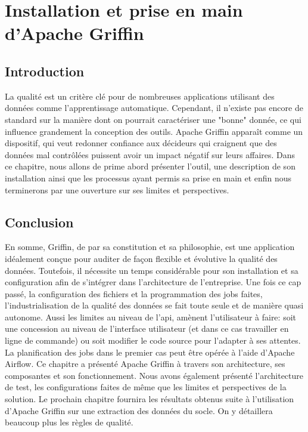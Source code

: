 \chapter{Installation et prise en main d'Apache Griffin}
\section*{Introduction}
La qualité est un critère clé pour de nombreuses applications utilisant des données comme l’apprentissage automatique. Cependant, il n’existe pas encore de standard sur la manière dont on pourrait caractériser une "bonne" donnée, ce qui influence grandement la conception des outils. Apache Griffin apparaît comme un dispositif, qui veut redonner confiance aux décideurs qui craignent que des données mal contrôlées puissent avoir un impact négatif sur leurs affaires. Dans ce chapitre, nous allons de prime abord pr\'esenter l'outil, une description de son installation ainsi que les processus ayant permis sa prise en main et enfin nous terminerons par une ouverture sur ses limites et perspectives.



\section*{Conclusion}
En somme, Griffin, de par sa constitution et sa philosophie, est une application id\'ealement conçue pour auditer de façon flexible et \'evolutive la qualit\'e des donn\'ees. Toutefois, il n\'ecessite un temps consid\'erable pour son installation et sa configuration afin de s'int\'egrer dans l'architecture de l'entreprise. Une fois ce cap pass\'e, la configuration des fichiers et la programmation des jobs faites, l'industrialisation de la qualit\'e des donn\'ees se fait toute seule et de mani\`ere quasi autonome. Aussi les limites au niveau de l'\acrshort{api}, am\`enent l'utilisateur \`a faire: soit une concession au niveau de l'interface utilisateur (et dans ce cas travailler en ligne de commande) ou soit modifier le code source pour l'adapter \`a ses attentes. La planification des jobs dans le premier cas peut \^etre op\'er\'ee \`a l'aide d'Apache Airflow. Ce chapitre a présenté Apache Griffin à travers son architecture, ses composantes et son fonctionnement. Nous avons \'egalement pr\'esent\'e l'architecture de test, les configurations faites de m\^eme que les limites et perspectives de la solution.  Le prochain chapitre fournira les résultats obtenus suite à l’utilisation d'Apache Griffin sur une extraction des donn\'ees du socle. On y d\'etaillera beaucoup plus les r\`egles de qualit\'e.